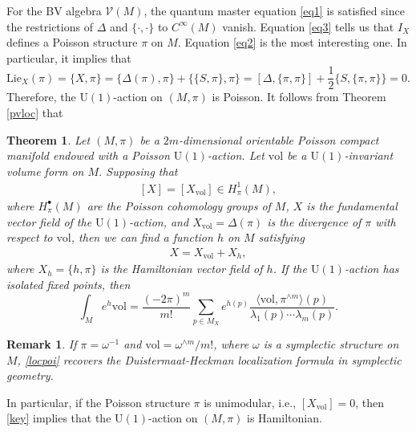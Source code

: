 \documentclass[12pt]{amsart}
\numberwithin{table}{section}
\numberwithin{equation}{section}
\newtheorem{rmk}{Remark}[section]
\newtheorem{thm}{Theorem}[section]
\theoremstyle{plain}
\newcommand{\vol}{\mathrm{vol}}
\newcommand{\MV}{\mathcal{V}}
\begin{document}
For the BV algebra $\MV(M)$, the quantum master equation \eqref{eq1} is satisfied since the restrictions of $\Delta$ and $\{\cdot, \cdot\}$ to $C^{\infty}(M)$ vanish. Equation \eqref{eq3} tells us that $I_X$ defines a Poisson structure $\pi$ on $M$.  Equation \eqref{eq2} is the most interesting one. In particular, it implies that
\[
\mathrm{Lie}_X(\pi) = \{X, \pi\} = \{\Delta(\pi), \pi\} + \{\{S,\pi\} , \pi\} = [\Delta, \{\pi, \pi\}] + \frac{1}{2} \{S, \{\pi,\pi\}\}= 0.
\]
Therefore, the $\mathrm{U}(1)$-action on $(M,\pi)$ is Poisson.
It follows from Theorem \ref{pvloc} that
\begin{thm}\label{ap1}
	Let $(M, \pi)$ be a $2m$-dimensional orientable Poisson compact manifold endowed with a Poisson $\mathrm{U(1)}$-action. Let $\vol$ be a $\mathrm{U}(1)$-invariant volume form on $M$. Supposing that
	\begin{align}\label{key}
		[X]=[X_{\vol}] \in H^1_{\pi}(M),
	\end{align}
	where $H^{\bullet}_{\pi}(M)$ are the Poisson cohomology groups of $M$, $X$ is the fundamental vector field of the $\mathrm{U}(1)$-action, and $X_{\vol}=\Delta(\pi)$ is the divergence of $\pi$ with respect to $\vol$, then we can find a function $h$ on $M$ satisfying
	\begin{align*}
		 X = X_{\vol} + X_h, 
	\end{align*}
	where $X_h = \{h, \pi\}$ is the Hamiltonian vector field of $h$. If the $\mathrm{U}(1)$-action has isolated fixed points, then
	\begin{equation}\label{locpoi}
		\int_M e^h \vol  = \frac{(-2\pi)^m}{m!} \sum_{p \in M_{X}}e^{h(p)}\frac{\langle \vol, \pi^{\wedge m}\rangle (p)}{\lambda_1(p)\cdots\lambda_m(p)}.
	\end{equation}
\end{thm}
\begin{rmk}
	If $\pi = \omega^{-1}$ and $\vol = \omega^{\wedge m}/m!$, where $\omega$ is a symplectic structure on $M$, \eqref{locpoi} recovers the Duistermaat-Heckman localization formula in symplectic geometry.
\end{rmk}

In particular, if the Poisson structure $\pi$ is unimodular, i.e., $[X_{\vol}]=0$, then \eqref{key} implies that the $\mathrm{U}(1)$-action on $(M,\pi)$ is Hamiltonian.
\end{document}
